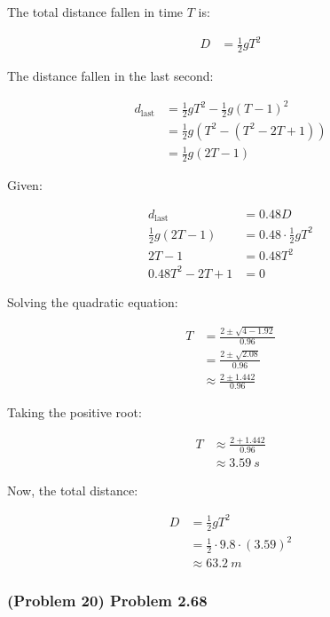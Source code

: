 \begin{solution}
	The total distance fallen in time \( T \) is:

	\begin{align*}
		D &= \frac{1}{2} g T^2
	\end{align*}

	The distance fallen in the last second:

	\begin{align*}
		d_{\mathrm{last}} &= \frac{1}{2} g T^2 - \frac{1}{2} g (T - 1)^2 \\
		&= \frac{1}{2} g \left( T^2 - (T^2 - 2T + 1) \right) \\
		&= \frac{1}{2} g (2T - 1)
	\end{align*}

	Given:

	\begin{align*}
		d_{\mathrm{last}} &= 0.48 D \\
		\frac{1}{2} g (2T - 1) &= 0.48 \cdot \frac{1}{2} g T^2 \\
		2T - 1 &= 0.48 T^2 \\
		0.48 T^2 - 2T + 1 &= 0
	\end{align*}

	Solving the quadratic equation:

	\begin{align*}
		T &= \frac{2 \pm \sqrt{4 - 1.92}}{0.96} \\
		&= \frac{2 \pm \sqrt{2.08}}{0.96} \\
		&\approx \frac{2 \pm 1.442}{0.96}
	\end{align*}

	Taking the positive root:

	\begin{align*}
		T &\approx \frac{2 + 1.442}{0.96} \\
		&\approx \SI{3.59}{s}
	\end{align*}

	Now, the total distance:

	\begin{align*}
		D &= \frac{1}{2} g T^2 \\
		&= \frac{1}{2} \cdot 9.8 \cdot (3.59)^2 \\
		&\approx \boxed{\SI{63.2}{m}}
	\end{align*}
\end{solution}

\newpage

\subsubsection{(Problem 20) Problem 2.68}

